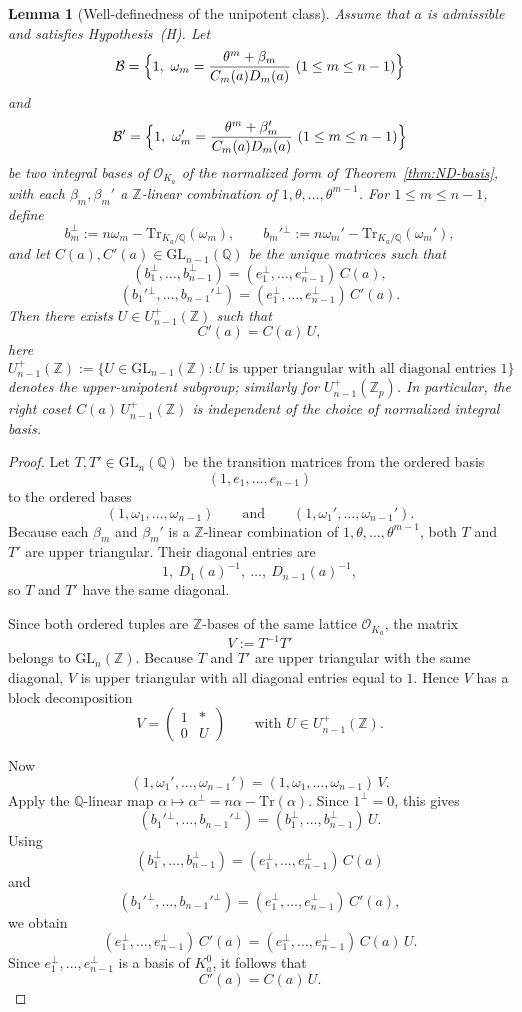 \documentclass[11pt,letterpaper]{amsart}
\newcommand{\Q}{\mathbb{Q}}
\newcommand{\Z}{\mathbb{Z}}
\newcommand{\cO}{\mathcal{O}}
\newcommand{\GL}{\mathrm{GL}}
\newcommand{\Tr}{\mathrm{Tr}}
\theoremstyle{plain}
\newtheorem{lemma}[theorem]{Lemma}
\theoremstyle{definition}
\begin{document}
\begin{lemma}[Well-definedness of the unipotent class]
\label{lem:Xi-well-defined}
Assume that \(a\) is admissible and satisfies Hypothesis~\textup{(H)}.
Let
\[
\mathcal B=
\Bigl\{1,\ \omega_m=\frac{\theta^m+\beta_m}{C_m(a)D_m(a)}\ (1\le m\le n-1)\Bigr\}
\]
and
\[
\mathcal B'=
\Bigl\{1,\ \omega_m'=\frac{\theta^m+\beta_m'}{C_m(a)D_m(a)}\ (1\le m\le n-1)\Bigr\}
\]
be two integral bases of \(\cO_{K_a}\) of the normalized form of
Theorem~\ref{thm:ND-basis}, with each \(\beta_m,\beta_m'\) a
\(\Z\)-linear combination of \(1,\theta,\dots,\theta^{m-1}\).
For \(1\le m\le n-1\), define
\[
b_m^\perp:=n\omega_m-\Tr_{K_a/\Q}(\omega_m),
\qquad
b_m'{}^\perp:=n\omega_m'-\Tr_{K_a/\Q}(\omega_m'),
\]
and let \(C(a),C'(a)\in \GL_{n-1}(\Q)\) be the unique matrices such that
\[
(b_1^\perp,\dots,b_{n-1}^\perp)
=(e_1^\perp,\dots,e_{n-1}^\perp)\,C(a),
\]
\[
(b_1'{}^\perp,\dots,b_{n-1}'{}^\perp)
=(e_1^\perp,\dots,e_{n-1}^\perp)\,C'(a).
\]
Then there exists \(U\in U_{n-1}^+(\Z)\) such that
\[
C'(a)=C(a)\,U,
\]
here
\[
U_{n-1}^+(\Z):=\{U\in \GL_{n-1}(\Z): U \text{ is upper triangular with all diagonal entries }1\}
\]
denotes the upper-unipotent subgroup; similarly for $U_{n-1}^+(\Z_p)$. In particular, the right coset \(C(a)\,U_{n-1}^+(\Z)\) is independent of the
choice of normalized integral basis.
\end{lemma}

\begin{proof}
Let \(T,T'\in \GL_n(\Q)\) be the transition matrices from the ordered basis
\[
(1,e_1,\dots,e_{n-1})
\]
to the ordered bases
\[
(1,\omega_1,\dots,\omega_{n-1})
\qquad\text{and}\qquad
(1,\omega_1',\dots,\omega_{n-1}').
\]
Because each \(\beta_m\) and \(\beta_m'\) is a \(\Z\)-linear combination of
\(1,\theta,\dots,\theta^{m-1}\), both \(T\) and \(T'\) are upper triangular.
Their diagonal entries are
\[
1,\ D_1(a)^{-1},\ \dots,\ D_{n-1}(a)^{-1},
\]
so \(T\) and \(T'\) have the same diagonal.

Since both ordered tuples are \(\Z\)-bases of the same lattice \(\cO_{K_a}\),
the matrix
\[
V:=T^{-1}T'
\]
belongs to \(\GL_n(\Z)\).
Because \(T\) and \(T'\) are upper triangular with the same diagonal, \(V\) is
upper triangular with all diagonal entries equal to \(1\).
Hence \(V\) has a block decomposition
\[
V=
\begin{pmatrix}
1 & * \\
0 & U
\end{pmatrix}
\qquad\text{with }U\in U_{n-1}^+(\Z).
\]

Now
\[
(1,\omega_1',\dots,\omega_{n-1}')
=
(1,\omega_1,\dots,\omega_{n-1})\,V.
\]
Apply the \(\Q\)-linear map \(\alpha\mapsto \alpha^\perp=n\alpha-\Tr(\alpha)\).
Since \(1^\perp=0\), this gives
\[
(b_1'{}^\perp,\dots,b_{n-1}'{}^\perp)
=
(b_1^\perp,\dots,b_{n-1}^\perp)\,U.
\]
Using
\[
(b_1^\perp,\dots,b_{n-1}^\perp)
=(e_1^\perp,\dots,e_{n-1}^\perp)\,C(a)
\]
and
\[
(b_1'{}^\perp,\dots,b_{n-1}'{}^\perp)
=(e_1^\perp,\dots,e_{n-1}^\perp)\,C'(a),
\]
we obtain
\[
(e_1^\perp,\dots,e_{n-1}^\perp)\,C'(a)
=
(e_1^\perp,\dots,e_{n-1}^\perp)\,C(a)\,U.
\]
Since \(e_1^\perp,\dots,e_{n-1}^\perp\) is a basis of \(K_a^0\), it follows that
\[
C'(a)=C(a)\,U.
\]
\end{proof}
\end{document}
